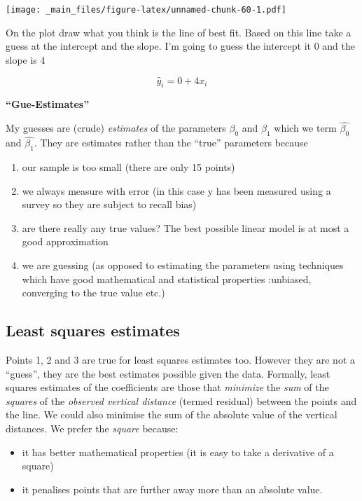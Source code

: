\documentclass[
]{gitbook}
\providecommand{\tightlist}{%
  \setlength{\itemsep}{0pt}\setlength{\parskip}{0pt}}
\begin{document}
\texttt{[image: \_main\_files/figure-latex/unnamed-chunk-60-1.pdf]}

On the plot draw what you think is the line of best fit. Based on this line take a guess at the intercept and the slope. I'm going to guess the intercept it 0 and the slope is 4

\[ \hat{y}_i = 0 + 4 x_i \]

\textbf{``Gue-Estimates''}

My guesses are (crude) \emph{estimates} of the parameters \(\beta_0\) and \(\beta_1\) which we term \(\hat{\beta_0}\) and \(\hat{\beta_1}\). They are estimates rather than the ``true'' parameters because

\begin{enumerate}
\def\labelenumi{\arabic{enumi}.}
\tightlist
\item
  our sample is too small (there are only 15 points)
\item
  we always measure with error (in this case y has been measured using a survey so they are subject to recall bias)
\item
  are there really any true values? The best possible linear model is at most a good approximation
\item
  we are guessing (as opposed to estimating the parameters using techniques which have good mathematical and statistical properties :unbiased, converging to the true value etc.)
\end{enumerate}

\hypertarget{least-squares-estimates}{%
\subsection{Least squares estimates}\label{least-squares-estimates}}

Points 1, 2 and 3 are true for least squares estimates too. However they are not a ``guess'', they are the best estimates possible given the data.
Formally, least squares estimates of the coefficients are those that \emph{minimize} the \emph{sum} of the \emph{squares} of the \emph{observed vertical distance} (termed residual) between the points and the line. We could also minimise the sum of the absolute value of the vertical distances. We prefer the \emph{square} because:

\begin{itemize}
\tightlist
\item
  it has better mathematical properties (it is easy to take a derivative of a square)
\item
  it penalises points that are further away more than an absolute value.
\end{itemize}
\end{document}
